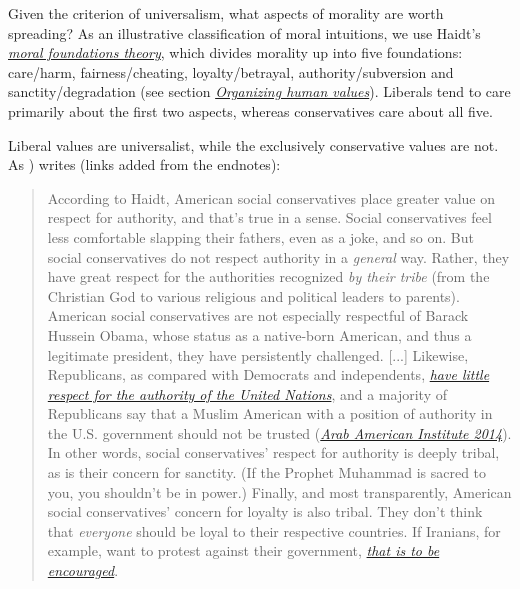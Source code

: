 Given the criterion of universalism, what aspects of morality are worth
spreading? As an illustrative classification of moral intuitions, we use
Haidt's
\href{https://en.wikipedia.org/wiki/Moral_foundations_theory}{\emph{moral
foundations theory}}, which divides morality up into five foundations:
care/harm, fairness/cheating, loyalty/betrayal, authority/subversion and
sanctity/degradation (see section
\protect\hyperlink{organizing-human-values}{\emph{Organizing human
values}}). Liberals tend to care primarily about the first two
aspects, whereas conservatives care about all five.

Liberal values are universalist, while the exclusively conservative
values are not. As \parencite{Greene2013-sq}) writes (links
added from the endnotes):

\begin{quote}
According to Haidt, American social conservatives place greater value on
respect for authority, and that's true in a sense. Social conservatives
feel less comfortable slapping their fathers, even as a joke, and so on.
But social conservatives do not respect authority in a \emph{general}
way. Rather, they have great respect for the authorities recognized
\emph{by their tribe} (from the Christian God to various religious and
political leaders to parents). American social conservatives are not
especially respectful of Barack Hussein Obama, whose status as a
native-born American, and thus a legitimate president, they have
persistently challenged. {[}...{]} Likewise, Republicans, as compared
with Democrats and independents,
\href{http://www.pewglobal.org/2009/09/21/obama-addresses-more-popular-un/}{\emph{have
little respect for the authority of the United Nations}}, and a majority
of Republicans say that a Muslim American with a position of authority
in the U.S. government should not be trusted
(\href{http://b.3cdn.net/aai/3e05a493869e6b44b0_76m6iyjon.pdf}{\emph{Arab
American Institute 2014}}). In other words, social conservatives'
respect for authority is deeply tribal, as is their concern for
sanctity. (If the Prophet Muhammad is sacred to you, you shouldn't be in
power.) Finally, and most transparently, American social conservatives'
concern for loyalty is also tribal. They don't think that
\emph{everyone} should be loyal to their respective countries. If
Iranians, for example, want to protest against their government,
\href{http://www.cbsnews.com/news/gop-hits-obama-for-silence-on-iran-protests/}{\emph{that
is to be encouraged}}.
\end{quote}

